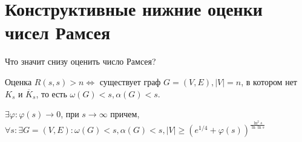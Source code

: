 \documentclass[document.tex]{subfiles}
\begin{document}
\section{Конструктивные нижние оценки чисел Рамсея}

Что значит снизу оценить число Рамсея?

Оценка $R(s, s) > n \Leftrightarrow $ существует граф $G = (V, E), |V| = n$, в котором нет $K_s$ и $\overline K_s$, то
есть $\omega(G) < s, \alpha(G) < s$.

\begin{theorem}
    $\exists \varphi: \varphi(s) \rightarrow 0$, при $s \rightarrow \infty$ причем, $\forall s: \exists G = (V, E): \omega(G) < s,
    \alpha(G) < s, |V| \geq (e^{1/4} + \varphi(s))^{\frac{\ln^2 s}{\ln \ln s}}$
\end{theorem}
\end{document}
